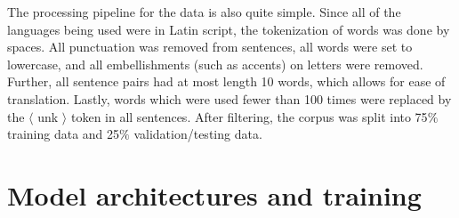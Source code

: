 \documentclass[twocolumn,superscriptaddress]{revtex4-1}
\begin{document}
The processing pipeline for the data is also quite simple.
Since all of the languages being used were in Latin script, the tokenization of words was done by spaces.
All punctuation was removed from sentences, all words were set to lowercase, and all embellishments (such as accents) on letters were removed.
Further, all sentence pairs had at most length 10 words, which allows for ease of translation.
Lastly, words which were used fewer than 100 times were replaced by the $\langle$ unk $\rangle$ token in all sentences.
After filtering, the corpus was split into 75$\%$ training data and 25$\%$ validation/testing data.

\section{Model architectures and training}
\end{document}
